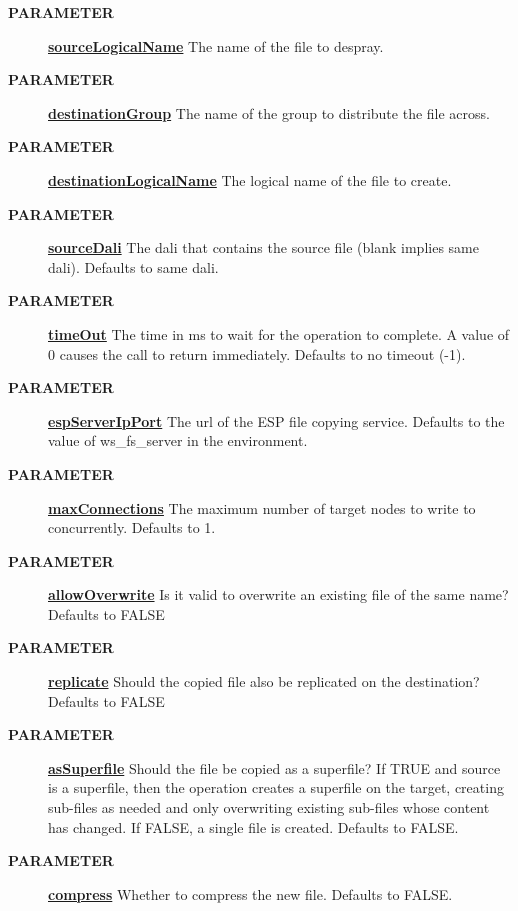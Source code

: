 \par
\begin{description}
\item [\colorbox{tagtype}{\color{white} \textbf{\textsf{PARAMETER}}}] \textbf{\underline{sourceLogicalName}} The name of the file to despray.
\item [\colorbox{tagtype}{\color{white} \textbf{\textsf{PARAMETER}}}] \textbf{\underline{destinationGroup}} The name of the group to distribute the file across.
\item [\colorbox{tagtype}{\color{white} \textbf{\textsf{PARAMETER}}}] \textbf{\underline{destinationLogicalName}} The logical name of the file to create.
\item [\colorbox{tagtype}{\color{white} \textbf{\textsf{PARAMETER}}}] \textbf{\underline{sourceDali}} The dali that contains the source file (blank implies same dali). Defaults to same dali.
\item [\colorbox{tagtype}{\color{white} \textbf{\textsf{PARAMETER}}}] \textbf{\underline{timeOut}} The time in ms to wait for the operation to complete. A value of 0 causes the call to return immediately. Defaults to no timeout (-1).
\item [\colorbox{tagtype}{\color{white} \textbf{\textsf{PARAMETER}}}] \textbf{\underline{espServerIpPort}} The url of the ESP file copying service. Defaults to the value of ws\_fs\_server in the environment.
\item [\colorbox{tagtype}{\color{white} \textbf{\textsf{PARAMETER}}}] \textbf{\underline{maxConnections}} The maximum number of target nodes to write to concurrently. Defaults to 1.
\item [\colorbox{tagtype}{\color{white} \textbf{\textsf{PARAMETER}}}] \textbf{\underline{allowOverwrite}} Is it valid to overwrite an existing file of the same name? Defaults to FALSE
\item [\colorbox{tagtype}{\color{white} \textbf{\textsf{PARAMETER}}}] \textbf{\underline{replicate}} Should the copied file also be replicated on the destination? Defaults to FALSE
\item [\colorbox{tagtype}{\color{white} \textbf{\textsf{PARAMETER}}}] \textbf{\underline{asSuperfile}} Should the file be copied as a superfile? If TRUE and source is a superfile, then the operation creates a superfile on the target, creating sub-files as needed and only overwriting existing sub-files whose content has changed. If FALSE, a single file is created. Defaults to FALSE.
\item [\colorbox{tagtype}{\color{white} \textbf{\textsf{PARAMETER}}}] \textbf{\underline{compress}} Whether to compress the new file. Defaults to FALSE.

\end{description}

